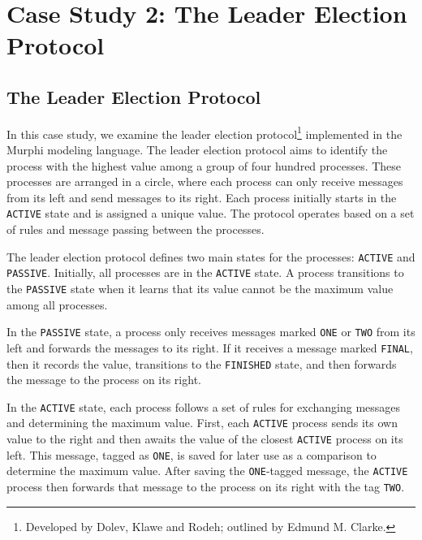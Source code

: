 
\section{Case Study 2: The Leader Election Protocol}\label{sec:leader-election}

\subsection{The Leader Election Protocol}\label{subsec:the-leader-election-protocol}

In this case study, we examine the leader election
protocol\footnote{Developed by Dolev, Klawe and Rodeh; outlined by Edmund M. Clarke.}
implemented in
the Murphi modeling language.
The leader election protocol aims to identify the process with the highest
value among a group of four hundred processes.
These processes are arranged in a circle, where each process can only receive
messages from its left and send messages to its right.
Each process initially starts in the \texttt{ACTIVE} state and is assigned a
unique value.
The protocol operates based on a set of rules and message passing between the
processes.

The leader election protocol defines two main states for the processes:
\texttt{ACTIVE} and \texttt{PASSIVE}.
Initially, all processes are in the \texttt{ACTIVE} state.
A process transitions to the \texttt{PASSIVE} state when it learns that its
value cannot be the maximum value among all processes.

In the \texttt{PASSIVE} state, a process only receives messages marked
\texttt{ONE} or \texttt{TWO} from its left and forwards the messages to its
right.
If it receives a message marked \texttt{FINAL}, then it records the value,
transitions to the \texttt{FINISHED} state, and then forwards the message
to the process on its right.

In the \texttt{ACTIVE} state, each process follows a set of rules for
exchanging messages and determining the maximum value.
First, each \texttt{ACTIVE} process sends its own value to the right and then
awaits the value of the closest \texttt{ACTIVE} process on its left.
This message, tagged as \texttt{ONE}, is saved for later use as a comparison
to determine the maximum value.
After saving the \texttt{ONE}-tagged message, the \texttt{ACTIVE} process then
forwards that message to the process on its right with the tag \texttt{TWO}.

